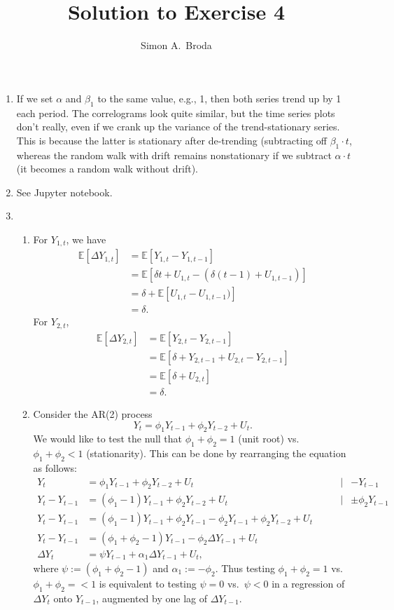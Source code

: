 \documentclass[11pt, a4paper]{article}
\newcommand{\E}{\ensuremath{{\mathbb E}}} %
\begin{document}
\title{Solution to Exercise 4}
\author{Simon A.\ Broda}
\date{}
\maketitle

\begin{enumerate}
\item If we set $\alpha$ and $\beta_1$ to the same value, e.g., 1, then both series trend up by 1 each period. The correlograms look quite similar, but the time series plots don't really, even if we crank up the variance of the trend-stationary series. This is because the latter is stationary after de-trending (subtracting off $\beta_1\cdot t$, whereas the random walk with drift remains nonstationary if we subtract $\alpha\cdot t$ (it becomes a random walk without drift).
\item See Jupyter notebook.
\item
\begin{enumerate}

\item
For $Y_{1,t}$, we have
\begin{align*}
\E[\Delta Y_{1,t}]&=\E[Y_{1,t}-Y_{1,t-1}]\\
&=\E[\delta t+U_{1,t}-(\delta (t-1)+U_{1,t-1})]\\
&=\delta +\E[U_{1,t}-U_{1,t-1})]\\
&=\delta.
\end{align*}
For $Y_{2,t}$,
\begin{align*}
\E[\Delta Y_{2,t}]&=\E[Y_{2,t}-Y_{2,t-1}]\\
&=\E[\delta + Y_{2,t-1}+U_{2,t}-Y_{2,t-1}]\\
&=\E[\delta + U_{2,t}]\\
&=\delta.
\end{align*}
\item Consider the AR(2) process
\[
Y_t=\phi_1Y_{t-1}+\phi_2Y_{t-2}+U_t.
\]
We would like to test the null that $\phi_1+\phi_2=1$ (unit root) vs.\ $\phi_1+\phi_2<1$ (stationarity). This can be done by rearranging the equation as follows:
\begin{align*}
Y_t&=\phi_1Y_{t-1}+\phi_2Y_{t-2}+U_t&\mid&-Y_{t-1}\\
Y_t-Y_{t-1}&=(\phi_1-1)Y_{t-1}+\phi_2Y_{t-2}+U_t&\mid&\pm \phi_2Y_{t-1}\\
Y_t-Y_{t-1}&=(\phi_1-1)Y_{t-1}+\phi_2Y_{t-1}-\phi_2Y_{t-1}+\phi_2Y_{t-2}+U_t\qquad&\\
Y_t-Y_{t-1}&=(\phi_1+\phi_2-1)Y_{t-1}-\phi_2\Delta Y_{t-1}+U_t&\\
\Delta Y_t&=\psi Y_{t-1}+\alpha_1\Delta Y_{t-1}+U_t,&
\end{align*}
where $\psi:=(\phi_1+\phi_2-1)$ and $\alpha_1:=-\phi_2$. Thus testing $\phi_1+\phi_2=1$ vs.\ $\phi_1+\phi_2=<1$ is equivalent to testing $\psi=0$ vs.\ $\psi<0$ in a regression of
$\Delta Y_t$ onto $Y_{t-1}$, augmented by one lag of $\Delta Y_{t-1}$.

\end{enumerate}


\end{enumerate}
\end{document}
